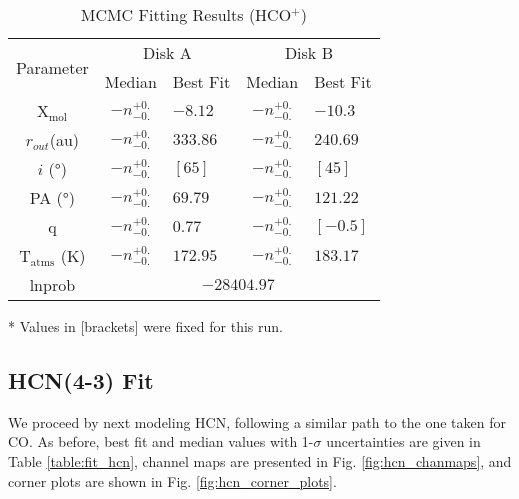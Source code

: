 \begin{table}
  \centering
  \begin{threeparttable}
    \caption{MCMC Fitting Results (HCO$^+$)}
    \label{table:fit_hco}
    \renewcommand{\arraystretch}{1.2}
    \begin{tabular}{c c l c l }
      \toprule \toprule
      \multirow{2}{*}{Parameter} & \multicolumn{2}{c}{Disk A} & \multicolumn{2}{c}{Disk B} \\
                                 & Median & Best Fit          & Median & Best Fit \\
      \midrule %
      X$_\text{mol}$            & $ -n _{-0.} ^{+0.}$ & $-8.12$    & $ -n _{-0.} ^{+0.}$ & $-10.3$ \\
      $r_{out}$(\si{au})        & $ -n _{-0.} ^{+0.}$ & $333.86$    & $ -n _{-0.} ^{+0.}$  & $240.69$    \\
      $i$ (\si{\degree})        & $ -n _{-0.} ^{+0.}$ & $[65]$    & $ -n _{-0.} ^{+0.}$ & $[45]$    \\
      PA  (\si{\degree})        & $ -n _{-0.} ^{+0.}$ & $69.79$  & $ -n _{-0.} ^{+0.}$  & $121.22$  \\
      q                         & $ -n _{-0.} ^{+0.}$ & $0.77$  & $ -n _{-0.} ^{+0.}$  & $[-0.5]$  \\
      T$_\text{atms}$ (\si{\K}) & $ -n _{-0.} ^{+0.}$ & $172.95 $  & $ -n _{-0.} ^{+0.}$  & $183.17$  \\
      lnprob                    & \multicolumn{4}{c}{$-28404.97$} \\
      \bottomrule
    \end{tabular}
    \begin{tablenotes}\footnotesize
      \item[*] Values in [brackets] were fixed for this run.
    \end{tablenotes}
  \end{threeparttable}
\end{table}








\subsection{HCN(4-3) Fit}

We proceed by next modeling HCN, following a similar path to the one taken for CO. As before, best fit and median values with 1-$\sigma$  uncertainties are given in Table \ref{table:fit_hcn}, channel maps are presented in Fig. \ref{fig:hcn_chanmaps}, and corner plots are shown in Fig. \ref{fig:hcn_corner_plots}.

